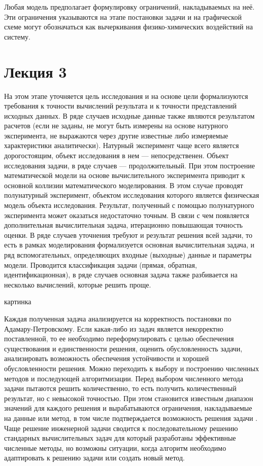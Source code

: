 \documentclass[12pt]{article}
\begin{document}
Любая модель предполагает формулировку ограничений, накладываемых на неё. Эти ограничения указываются на этапе постановки задачи и на графической схеме могут обозначаться как вычеркивания физико-химических воздействий на систему.

\newpage
\section{Лекция 3}
На этом этапе уточняется цель исследования и на основе цели формализуются требования к точности вычислений результата и к точности представлений исходных данных. В ряде случаев исходные данные также являются результатом расчетов (если не заданы, не могут быть измерены на основе натурного эксперимента, не выражаются через другие известные либо измеряемые характеристики аналитически). Натурный эксперимент чаще всего является дорогостоящим, объект исследования в нем --- непосредственен. Объект исследования задачи, в ряде случаев --- продолжительный. При этом построение математической модели на основе вычислительного эксперимента приводит к основной коллизии математического моделирования. В этом случае проводят полунатурный эксперимент, объектом исследования которого является физическая модель объекта исследования. Результат, полученный с помощью полунатурного  эксперимента может оказаться недостаточно точным. В связи с чем появляется дополнительная вычислительная задача, итерационно повышающая точность оценки. В ряде случаев уточнения требуют и результат решения всей задачи, то есть в рамках моделирования формализуется основная вычислительная задача, и ряд вспомогательных, определяющих входные (выходные) данные и параметры модели. Проводится классификация задачи (прямая, обратная, идентификационная), в ряде случаев основная задача также разбивается на несколько вычислений, которые решить проще.

\begin{center}
    картинка
\end{center}

Каждая полученная задача анализируется на корректность постановки по Адамару-Петровскому. Если какая-либо из задач является некорректно поставленной, то ее необходимо переформулировать с целью обеспечения существования и единственности решения, оценить обусловленность задачи, анализировать возможность обеспечения устойчивости и хорошей обусловленности решения. Можно переходить к выбору и построению численных методов и последующей алгоритмизации. Перед выбором численного метода задачи пытаются решить количественно, то есть получить количественный результат, но с невысокой точностью. При этом становится известным диапазон значений для каждого решения и вырабатываются ограничения, накладываемые на данные или метод, в том числе подтверждается возможность решения задачи . Чаще решение инженерной задачи сводится к последовательному решению стандарных вычислительных задач для который разработаны эффективные численные методы, но возможны ситуации, когда алгоритм необходимо адаптировать к решению задачи или создать новый метод.
\end{document}
